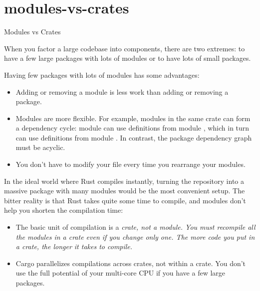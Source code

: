 \documentclass{article}
\begin{document}
\begin{description}
\end{description}

\section{modules-vs-crates}{Modules vs Crates}

When you factor a large codebase into components, there are two extremes:
to have a few large packages with lots of modules or
to have lots of small packages.

Having few packages with lots of modules has some advantages:
\begin{itemize}
  \item 
    Adding or removing a module is less work than adding or removing a package.
  \item 
    Modules are more flexible.
    For example, modules in the same crate can form a dependency cycle: module  can use definitions from module , which in turn can use definitions from module .
    In contrast, the package dependency graph must be acyclic.
  \item 
    You don't have to modify your  file every time you rearrange your modules.
\end{itemize}

In the ideal world where Rust compiles instantly, turning the repository into a massive package with many modules would be the most convenient setup.
The bitter reality is that Rust takes quite some time to compile, and modules don't help you shorten the compilation time:
\begin{itemize}
\item 
  The basic unit of compilation is a \em{crate}, not a \em{module}.
  You must recompile all the modules in a crate even if you change only one.
  The more code you put in a crate, the longer it takes to compile.
\item 
  Cargo parallelizes compilations across crates, not within a crate.
  You don't use the full potential of your multi-core CPU if you have a few large packages.
\end{itemize}
\end{document}
